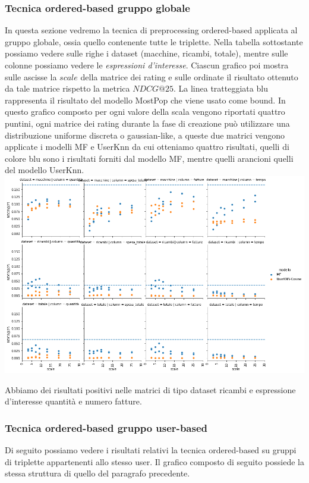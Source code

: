 \subsubsection{Tecnica ordered-based gruppo globale}
In questa sezione vedremo la tecnica di preprocessing ordered-based applicata al gruppo globale, ossia quello contenente tutte le triplette.
Nella tabella sottostante possiamo vedere sulle righe i dataset (macchine, ricambi, totale), mentre sulle colonne possiamo vedere le \textit{espressioni d'interesse}. Ciascun grafico poi mostra sulle ascisse la $scale$ della matrice dei rating e sulle ordinate il risultato ottenuto da tale matrice rispetto la metrica $NDCG@25$. La linea tratteggiata blu rappresenta il risultato del modello MostPop che viene usato come bound.
In questo grafico composto per ogni valore della scala vengono riportati quattro puntini, ogni matrice dei rating durante la fase di creazione può utilizzare una distribuzione uniforme discreta o gaussian-like, a queste due matrici vengono applicate i modelli MF e UserKnn da cui otteniamo quattro risultati, quelli di colore blu sono i risultati forniti dal modello MF, mentre quelli arancioni quelli del modello UserKnn. \\
\includegraphics[width=16cm]{figures/risultati_ordered_globale.png}

Abbiamo dei risultati positivi nelle matrici di tipo dataset ricambi e espressione d'interesse quantità e numero fatture.\\

\subsubsection{Tecnica ordered-based gruppo user-based}
Di seguito possiamo vedere i risultati relativi la tecnica ordered-based su gruppi di triplette appartenenti allo stesso user.
Il grafico composto di seguito possiede la stessa struttura di quello del paragrafo precedente.\\

